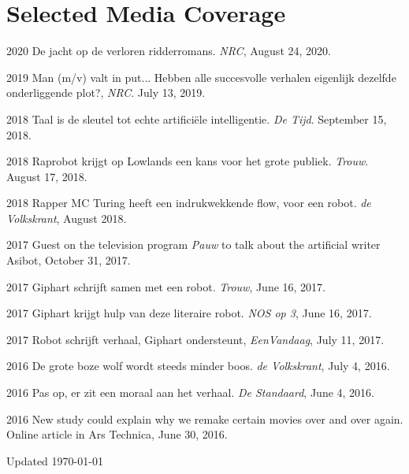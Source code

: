 \documentclass[12pt,letterpaper]{report}
\begin{document}
\section*{Selected Media Coverage}
\begin{tablist}
\item[2020] \tab{}De jacht op de verloren ridderromans. \textit{NRC}, August 24, 2020.
\item[2019] \tab{}Man (m/v) valt in put... Hebben alle succesvolle verhalen eigenlijk
  dezelfde onderliggende plot?, \textit{NRC}. July 13, 2019. 
\item[2018] \tab{}Taal is de sleutel tot echte artificiële intelligentie. \textit{De Tijd}.
  September 15, 2018.
\item[2018] \tab{}Raprobot krijgt op Lowlands een kans voor het grote publiek. \textit{Trouw}.
  August 17, 2018. 
\item[2018] \tab{}Rapper MC Turing heeft een indrukwekkende flow, voor een robot. \textit{de
    Volkskrant}, August 2018. 
\item[2017] \tab{}Guest on the television program \textit{Pauw} to talk about the artificial
  writer Asibot, October 31, 2017.
\item[2017] \tab{}Giphart schrijft samen met een robot. \textit{Trouw}, June 16, 2017. 
\item[2017] \tab{}Giphart krijgt hulp van deze literaire robot. \textit{NOS op 3}, June 16, 2017. 
\item[2017] \tab{}Robot schrijft verhaal, Giphart ondersteunt, \textit{EenVandaag}, July
  11, 2017.
\item[2016] \tab{}De grote boze wolf wordt steeds minder boos. \textit{de Volkskrant},
  July 4, 2016. 
\item[2016] \tab{}Pas op, er zit een moraal aan het verhaal. \textit{De Standaard}, June
  4, 2016. 
\item[2016] \tab{}New study could explain why we remake certain movies over and over
  again. Online article in Ars Technica, June 30, 2016.
\end{tablist}
  

\begin{center}
  \vfill
Updated \monthyeardate\today
\end{center}
\end{document}
